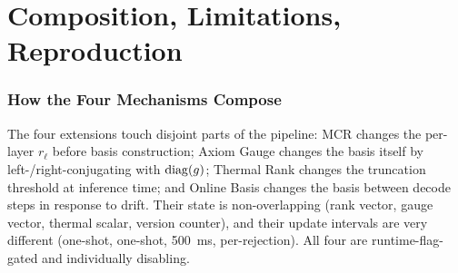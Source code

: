 \documentclass[11pt]{article}
\begin{document}
\part{Composition, Limitations, Reproduction}

\section{How the Four Mechanisms Compose}
\label{sec:compose}
The four extensions touch disjoint parts of the pipeline:
MCR changes the per-layer $r_\ell$ before basis construction;
Axiom Gauge changes the basis itself by left-/right-conjugating with
$\operatorname{diag}(g)$; Thermal Rank changes the truncation threshold at inference
time; and Online Basis changes the basis between decode steps in response
to drift.  Their state is non-overlapping (rank vector, gauge vector,
thermal scalar, version counter), and their update intervals are very
different (one-shot, one-shot, 500~ms, per-rejection).  All four are
runtime-flag-gated and individually disabling.
\end{document}

